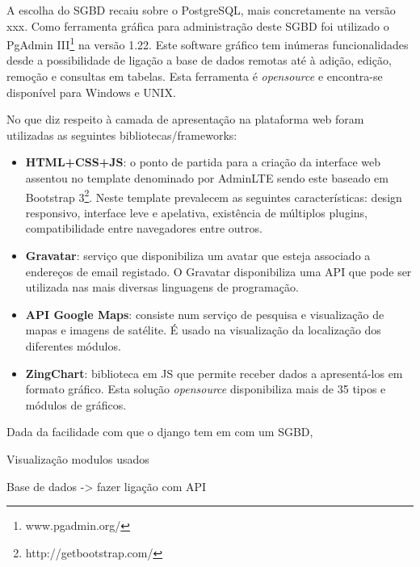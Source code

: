 A escolha do \ac{SGBD} recaiu sobre o PostgreSQL, mais concretamente na versão xxx. Como ferramenta gráfica para administração deste \ac{SGBD} foi utilizado o PgAdmin III\footnote{www.pgadmin.org/} na versão 1.22. Este software gráfico tem inúmeras funcionalidades desde a possibilidade de ligação a base de dados remotas até à adição, edição, remoção e  consultas em tabelas. Esta ferramenta é \textit{opensource} e encontra-se disponível para Windows e UNIX.


No que diz respeito à camada de apresentação na plataforma web foram utilizadas as seguintes bibliotecas/frameworks: 

\begin{itemize}
	\item \textbf{\ac{HTML}+\ac{CSS}+\ac{JS}}: o ponto de partida para a criação da interface web assentou no template denominado por AdminLTE sendo este baseado em Bootstrap 3\footnote{http://getbootstrap.com/}. Neste template prevalecem as seguintes características:  design responsivo, interface leve e apelativa, existência de múltiplos plugins, compatibilidade entre navegadores entre outros. 
	
	\item \textbf{Gravatar}: serviço que disponibiliza um avatar que esteja associado a endereços de email registado. O Gravatar disponibiliza uma API que pode ser utilizada nas mais diversas linguagens de programação\cite{gravatar}.
	 
	\item \textbf{\ac{API} Google Maps}: consiste num serviço de pesquisa e visualização de mapas e imagens de satélite. É usado na visualização da localização dos diferentes módulos. 
	
	\item \textbf{ZingChart}: biblioteca em \ac{JS} que permite receber dados a apresentá-los em formato gráfico. Esta solução \textit{opensource} disponibiliza mais de 35 tipos e módulos de gráficos. 
\end{itemize}




Dada da facilidade com que o django tem em  com um SGBD, 



Visualização modulos usados 




Base de dados -> fazer ligação com API 














